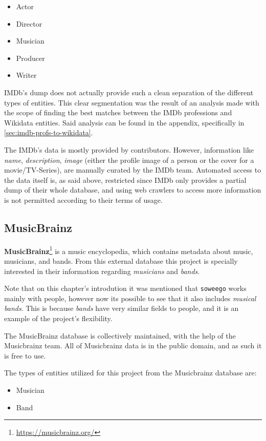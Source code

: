 \documentclass[epsfig,a4paper,11pt,titlepage,twoside,openany]{book}
\newcommand{\footurl}[1]{\footnote{\url{#1}}}
\begin{document}
\begin{itemize}
\item Actor
\item Director
\item Musician
\item Producer
\item Writer
\end{itemize}

IMDb’s dump does not actually provide such a clean separation of the different types of entities. This clear segmentation was the result of an analysis made with the scope of finding the best matches between the IMDb professions and Wikidata entities. Said analysis can be found in the appendix, specifically in \autoref{sec:imdb-profs-to-wikidata}. 

The IMDb’s data is mostly provided by contributors. However, information like \textit{name}, \textit{description}, \textit{image} (either the profile image of a person or the cover for a movie/TV-Series), are manually curated by the IMDb team. Automated access to the data itself is, as said above, restricted since IMDb only provides a partial dump of their whole database, and using web crawlers to access more information is not permitted according to their terms of usage.


\subsection{MusicBrainz}
\label{sec:catalog-musicbrainz}

\textbf{MusicBrainz}\footurl{https://musicbrainz.org/} is a music encyclopedia, which contains metadata about music, musicians, and bands. From this external database this project is specially interested in their information regarding \textit{musicians} and \textit{bands}. 


Note that on this chapter’s introdution it was mentioned that \texttt{soweego} works mainly with people, however now its possible to see that it also includes \textit{musical bands}. This is because \textit{bands} have very similar fields to people, and it is an example of the project's flexibility.

The MusicBrainz database is collectively maintained, with the help of the Musicbrainz team. All of Musicbrainz data is in the public domain, and as such it is free to use.

The types of entities utilized for this project from the Musicbrainz database are:

\begin{itemize}
\item Musician
\item Band
\end{itemize}
\end{document}
